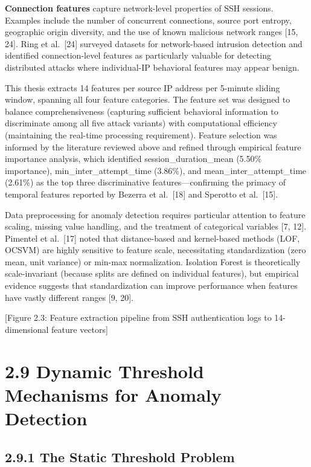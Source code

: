 \documentclass[
  a4paper]{report}
\begin{document}
\textbf{Connection features} capture network-level properties of SSH
sessions. Examples include the number of concurrent connections, source
port entropy, geographic origin diversity, and the use of known
malicious network ranges {[}15, 24{]}. Ring et al.~{[}24{]} surveyed
datasets for network-based intrusion detection and identified
connection-level features as particularly valuable for detecting
distributed attacks where individual-IP behavioral features may appear
benign.

This thesis extracts 14 features per source IP address per 5-minute
sliding window, spanning all four feature categories. The feature set
was designed to balance comprehensiveness (capturing sufficient
behavioral information to discriminate among all five attack variants)
with computational efficiency (maintaining the real-time processing
requirement). Feature selection was informed by the literature reviewed
above and refined through empirical feature importance analysis, which
identified session\_duration\_mean (5.50\% importance),
min\_inter\_attempt\_time (3.86\%), and mean\_inter\_attempt\_time
(2.61\%) as the top three discriminative features---confirming the
primacy of temporal features reported by Bezerra et al.~{[}18{]} and
Sperotto et al.~{[}15{]}.

Data preprocessing for anomaly detection requires particular attention
to feature scaling, missing value handling, and the treatment of
categorical variables {[}7, 12{]}. Pimentel et al.~{[}17{]} noted that
distance-based and kernel-based methods (LOF, OCSVM) are highly
sensitive to feature scale, necessitating standardization (zero mean,
unit variance) or min-max normalization. Isolation Forest is
theoretically scale-invariant (because splits are defined on individual
features), but empirical evidence suggests that standardization can
improve performance when features have vastly different ranges {[}9,
20{]}.

{[}Figure 2.3: Feature extraction pipeline from SSH authentication logs
to 14-dimensional feature vectors{]}

\section{2.9 Dynamic Threshold Mechanisms for Anomaly
Detection}\label{dynamic-threshold-mechanisms-for-anomaly-detection}

\subsection{2.9.1 The Static Threshold
Problem}\label{the-static-threshold-problem}
\end{document}
